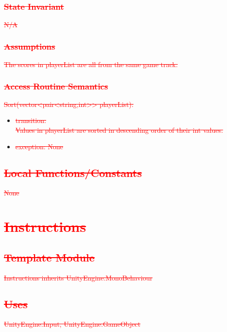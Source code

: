 \documentclass[12pt]{article}
\begin{document}
\subsubsection{\textcolor{red}{\sout{State Invariant}}}
\textcolor{red}{\sout{N/A}}

\subsubsection{\textcolor{red}{\sout{Assumptions}}}
\textcolor{red}{\sout{The scores in playerList are all from the same game track.}}

\subsubsection{\textcolor{red}{\sout{Access Routine Semantics}}}
\noindent \textcolor{red}{\sout{Sort(vector<pair<string,int>> playerList):}}
\begin{itemize}
	\item \textcolor{red}{\sout{transition:}}\\
	    \textcolor{red}{\sout{Values in playerList are sorted in descending order of their int values.}}
	\item \textcolor{red}{\sout{exception: None}}
\end{itemize}

\subsection{\textcolor{red}{\sout{Local Functions/Constants}}}
\textcolor{red}{\sout{None}}

\newpage

\section{\textcolor{red}{\sout{Instructions}}}

\subsection{\textcolor{red}{\sout{Template Module}}}
\textcolor{red}{\sout{Instructions inherits UnityEngine.MonoBehaviour}}

\subsection{\textcolor{red}{\sout{Uses}}}
\textcolor{red}{\sout{UnityEngine.Input, UnityEngine.GameObject}}
\end{document}

